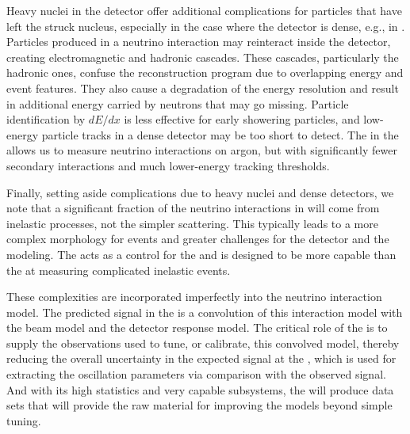 Heavy nuclei in the detector offer additional complications for particles that have left the struck nucleus, especially in the case where the detector is dense, e.g., in . Particles produced in a neutrino interaction may  reinteract inside the detector, creating electromagnetic and hadronic cascades. These cascades, particularly the hadronic ones, %
confuse the reconstruction program due to overlapping energy and event features. They also cause a degradation of the energy resolution and result in additional energy carried by neutrons that may go missing. Particle identification by $dE/dx$ is less effective for early showering particles, and  low-energy particle tracks in a dense detector may be too short to detect.  The  in the  
allows us to measure neutrino interactions %
on argon, but with significantly fewer secondary interactions and much lower-energy tracking thresholds.



Finally, setting aside complications due to heavy nuclei and dense detectors, we note that a significant fraction of the neutrino interactions in  will come from inelastic processes, not the simpler  scattering. 
This typically leads to a more complex morphology for events and greater challenges for the detector and the modeling.  The   acts as a control for the  and is designed to be more capable than the  at measuring complicated inelastic events.

These complexities are incorporated imperfectly into the neutrino interaction model. The predicted signal in the  is a convolution of this interaction model with the beam model and the detector response model.  The critical role of  the   is to supply the observations used to tune, or calibrate, this convolved model, thereby reducing the overall uncertainty in the expected signal at the , which is used for extracting the oscillation parameters via comparison with the observed signal.  And with its high statistics and very capable subsystems, the  will produce data sets that will provide the raw material for %
improving the models beyond simple tuning.  




